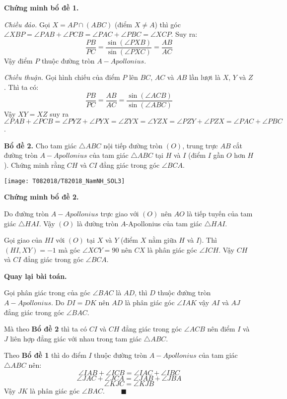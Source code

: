 \textbf{Chứng minh bổ đề 1.}

\textit{Chiều đảo.}
Gọi $X = AP \cap (ABC)$ (điểm $X \neq A$) thì góc $\angle XBP = \angle PAB + \angle PCB = \angle PAC + \angle PBC = \angle XCP$. Suy ra:
\[
\frac{PB}{PC} = \frac{\sin(\angle PXB)}{\sin(\angle PXC)} = \frac{AB}{AC}
\]
Vậy điểm $P$ thuộc đường tròn $A-Apollonius$.

\textit{Chiều thuận.} Gọi hình chiếu của điểm $P$ lên $BC$, $AC$ và $AB$ lần lượt là $X$, $Y$ và $Z$. Thì ta có:
\[
\frac{PB}{PC} =\frac{AB}{AC} = \frac{\sin(\angle ACB)}{\sin(\angle ABC)}
\]
Vậy $XY = XZ$ suy ra $\angle PAB + \angle PCB = \angle PYZ + \angle PYX = \angle ZYX = \angle YZX = \angle PZY + \angle PZX = \angle PAC + \angle PBC$.

\textbf{Bổ đề 2.} Cho tam giác $\triangle ABC$ nội tiếp đường tròn $(O)$, trung trực $AB$ cắt đường tròn $A-Apollonius$ của tam giác $\triangle ABC$ tại $H$ và $I$ (điểm $I$ gần $O$ hơn $H$). Chứng minh rằng $CH$ và $CI$ đẳng giác trong góc $\angle BCA$.

\begin{center}
	\texttt{[image: T082018/T82018\_NamNH\_SOL3]}
	
\end{center}

\textbf{Chứng minh bổ đề 2.}

Do đường tròn $A-Apollonius$ trực giao với $(O)$ nên $AO$ là tiếp tuyến của tam giác $\triangle HAI$. Vậy $(O)$ là đường tròn $A$-Apollonius của tam giác $\triangle HAI$.

Gọi giao của $HI$ với $(O)$ tại $X$ và $Y$ (điểm $X$ nằm giữa $H$ và $I$). Thì $(HI,XY) = -1$ mà góc $\angle XCY = 90$ nên $CX$ là phân giác góc $\angle ICH$. Vậy $CH$ và $CI$ đẳng giác trong góc $\angle BCA$.

\textbf{Quay lại bài toán.}

Gọi phân giác trong của góc $\angle BAC$ là $AD$, thì $D$ thuộc đường tròn $A-Apollonius$. Do $DI = DK$ nên $AD$ là phân giác góc $\angle IAK$ vậy $AI$ và $AJ$ đẳng giác trong góc $\angle BAC$.

Mà theo \textbf{Bổ đề 2} thì ta có $CI$ và $CH$ đẳng giác trong góc $\angle ACB$ nên điểm $I$ và $J$ liên hợp đẳng giác với nhau trong tam giác $\triangle ABC$.

Theo \textbf{Bổ đề 1} thì do điểm $I$ thuộc đường tròn $A-Apollonius$ của tam giác $\triangle ABC$ nên:
\[
\angle IAB + \angle ICB = \angle IAC + \angle IBC
\]
\[
\angle JAC + \angle JCA = \angle JAB + \angle JBA
\]
\[
\angle KJC = \angle KJB
\]
Vậy $JK$ là phân giác góc $\angle BAC$. $\qquad \blacksquare$

